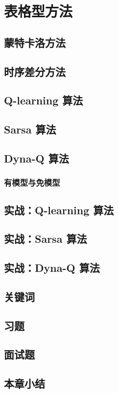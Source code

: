 \section{表格型方法}

\subsection{蒙特卡洛方法}
\subsection{时序差分方法}


\subsection{ Q-learning 算法}


\subsection{ Sarsa 算法}


\subsection{ Dyna-Q 算法}


\subsubsection{有模型与免模型}


\subsection{实战：Q-learning 算法}
\subsection{实战：Sarsa 算法}
\subsection{实战：Dyna-Q 算法}
\subsection{关键词}
\subsection{习题}
\subsection{面试题}
\subsection{本章小结}